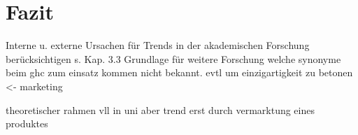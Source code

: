 \section{Fazit}
Interne u. externe Ursachen für Trends in der akademischen Forschung berücksichtigen s. Kap. 3.3
Grundlage für weitere Forschung
welche synonyme beim ghc zum einsatz kommen nicht bekannt. evtl um einzigartigkeit zu betonen <- marketing

theoretischer rahmen vll in uni aber trend erst durch vermarktung eines produktes